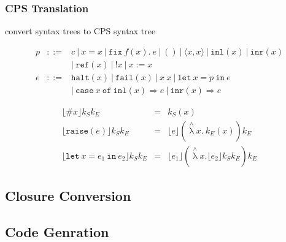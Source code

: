 \documentclass[dvipdfmx,cjk,xcolor=dvipsnames,envcountsect,notheorems,aspectratio=169]{beamer}
\theoremstyle{definition}
\newcommand{\FIX}{\texttt{fix}}
\newcommand{\LET}{\texttt{let}}
\newcommand{\IN}{\texttt{in}}
\newcommand{\INL}{\texttt{inl}}
\newcommand{\INR}{\texttt{inr}}
\newcommand{\CASE}{\texttt{case}}
\newcommand{\OF}{\texttt{of}}
\newcommand{\REF}{\texttt{ref}}
\newcommand{\RAISE}{\texttt{raise}}
\newcommand{\HALT}{\texttt{halt}}
\newcommand{\FAIL}{\texttt{fail}}
\newcommand{\METALAMBDA}{\mathop{\lambda}\limits^\wedge}
\begin{document}
\begin{frame}
	\frametitle{CPS Translation}
	\LARGE convert syntax trees to CPS syntax tree
	{\Large \[
		\begin{array}{rcl}
			p & ::= & c~|~x=x~|~\FIX~f(x).~e~|~()~|~\langle x, x \rangle~|~\INL(x)~|~\INR(x) \\
			  &     & |~\REF(x)~|~!x~|~x:=x \\
			e & ::= & \HALT(x)~|~\FAIL(x)~|~x~x~|~\LET~x=p~\IN~e \\
			  &     & |~\CASE~x~\OF~\INL(x)\Rightarrow e~|~\INR(x)\Rightarrow e
		\end{array}
	\]

	\[
		\begin{array}{rcl}
			\lfloor \#x \rfloor k_S k_E & = & k_S(x) \\
			\lfloor \RAISE(e) \rfloor k_S k_E & = & \lfloor e \rfloor (\METALAMBDA x.~k_E(x)) k_E \\
			\lfloor \LET~x=e_1~\IN~e_2 \rfloor k_S k_E & = & \lfloor e_1 \rfloor (\METALAMBDA x. \lfloor e_2 \rfloor k_S k_E) k_E
		\end{array}
	\]}
\end{frame}

\subsection{Closure Conversion}

\subsection{Code Genration}
\end{document}
